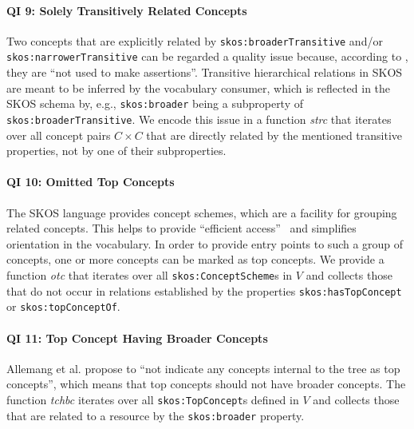 \paragraph{QI 9: Solely Transitively Related Concepts}

Two concepts that are explicitly related by \texttt{skos:broaderTransitive} and/or \texttt{skos:narrowerTransitive} can be regarded a quality issue because, according to \cite{SkosReference2008}, they are ``not used to make assertions''. Transitive hierarchical relations in SKOS are meant to be inferred by the vocabulary consumer, which is reflected in the SKOS schema by, e.g., \texttt{skos:broader} being a subproperty of \texttt{skos:broaderTransitive}. 
We encode this issue in a function \textit{strc} that iterates over all concept pairs $C \times C$ that are directly related by the mentioned transitive properties, not by one of their subproperties.


\paragraph{QI 10: Omitted Top Concepts}

The SKOS language provides concept schemes, which are a facility for grouping related concepts. This helps to provide ``efficient access''~\cite{Isaac2009} and simplifies orientation in the vocabulary. In order to provide entry points to such a group of concepts, one or more concepts can be marked as top concepts.  
We provide a function \textit{otc} that iterates over all \texttt{skos:ConceptScheme}s in $V$ and collects those that do not occur in relations established by the properties \texttt{skos:hasTopConcept} or \texttt{skos:topConceptOf}.

\paragraph{QI 11: Top Concept Having Broader Concepts}

Allemang et al. \cite{Allemang2011} propose to ``not indicate any concepts internal to the tree as top concepts'', which means that top concepts should not have broader concepts. 
The function \textit{tchbc} iterates over all \texttt{skos:TopConcept}s defined in $V$ and collects those that are related to a resource by the \texttt{skos:broader} property.

